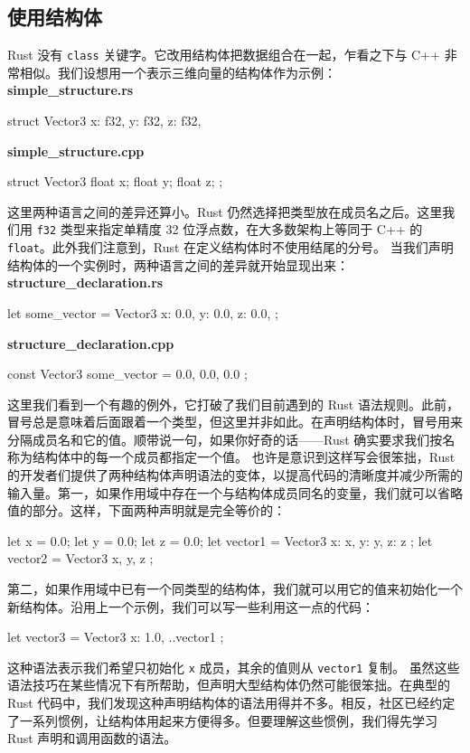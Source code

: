 \subsection{使用结构体}
\label{idx:idx_a53f2ef5}
Rust 没有 \texttt{class} 关键字。它改用结构体把数据组合在一起，乍看之下与 C++ 非常相似。我们设想用一个表示三维向量的结构体作为示例：
\textbf{simple\_\allowbreak{}structure.\allowbreak{}rs}
\begin{codebox}[rust]
struct Vector3 {
    x: f32,
    y: f32,
    z: f32,
}
\end{codebox}
\textbf{simple\_\allowbreak{}structure.\allowbreak{}cpp}
\begin{codebox}[rust]
struct Vector3 {
    float x;
    float y;
    float z;
};
\end{codebox}
这里两种语言之间的差异还算小。Rust 仍然选择把类型放在成员名之后。这里我们用 \texttt{f32} 类型来指定单精度 32 位浮点数，在大多数架构上等同于 C++ 的 \texttt{float}。此外我们注意到，Rust 在定义结构体时不使用结尾的分号。
当我们声明结构体的一个实例时，两种语言之间的差异就开始显现出来：
\textbf{structure\_\allowbreak{}declaration.\allowbreak{}rs}
\begin{codebox}[rust]
let some_vector = Vector3 {
    x: 0.0,
    y: 0.0,
    z: 0.0,
};
\end{codebox}
\textbf{structure\_\allowbreak{}declaration.\allowbreak{}cpp}
\begin{codebox}[rust]
const Vector3 some_vector = { 0.0, 0.0, 0.0 };
\end{codebox}
\label{idx:idx_aa0f9156}
这里我们看到一个有趣的例外，它打破了我们目前遇到的 Rust 语法规则。此前，冒号总是意味着后面跟着一个类型，但这里并非如此。在声明结构体时，冒号用来分隔成员名和它的值。顺带说一句，如果你好奇的话——Rust 确实要求我们按名称为结构体中的每一个成员都指定一个值。
也许是意识到这样写会很笨拙，Rust 的开发者们提供了两种结构体声明语法的变体，以提高代码的清晰度并减少所需的输入量。第一，如果作用域中存在一个与结构体成员同名的变量，我们就可以省略值的部分。这样，下面两种声明就是完全等价的：
\begin{codebox}[rust]
let x = 0.0;
let y = 0.0;
let z = 0.0;
let vector1 = Vector3 { x: x, y: y, z: z };
let vector2 = Vector3 { x, y, z };
\end{codebox}
第二，如果作用域中已有一个同类型的结构体，我们就可以用它的值来初始化一个新结构体。沿用上一个示例，我们可以写一些利用这一点的代码：
\begin{codebox}[rust]
let vector3 = Vector3 { x: 1.0, ..vector1 };
\end{codebox}
这种语法表示我们希望只初始化 \texttt{x} 成员，其余的值则从 \texttt{vector1} 复制。
\label{idx:idx_c7a3d128}
虽然这些语法技巧在某些情况下有所帮助，但声明大型结构体仍然可能很笨拙。在典型的 Rust 代码中，我们发现这种声明结构体的语法用得并不多。相反，社区已经约定了一系列惯例，让结构体用起来方便得多。但要理解这些惯例，我们得先学习 Rust 声明和调用函数的语法。

